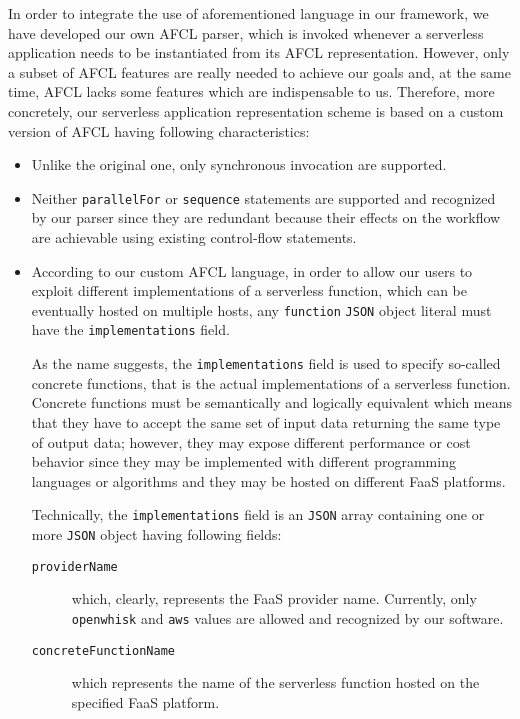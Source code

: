 \documentclass[12pt,a4paper]{report}
\begin{document}
In order to integrate the use of aforementioned language in our framework, we have developed our own AFCL parser, which is invoked whenever a serverless application needs to be instantiated from its AFCL representation. However, only a subset of AFCL features are really needed to achieve our goals and, at the same time, AFCL lacks some features which are indispensable to us. Therefore, more concretely, our serverless application representation scheme is based on a custom version of AFCL having following characteristics:

\begin{itemize}
	\item Unlike the original one, only synchronous invocation are supported.
	
	\item Neither \texttt{parallelFor} or \texttt{sequence} statements are supported and recognized by our parser since they are redundant because their effects on the workflow are achievable using existing control-flow statements.
	
	\item According to our custom AFCL language, in order to allow our users to exploit different implementations of a serverless function, which can be eventually hosted on multiple hosts, any \texttt{function} \texttt{JSON} object literal must have the \texttt{implementations} field.
	
	As the name suggests, the \texttt{implementations} field is used to specify so-called concrete functions, that is the actual implementations of a serverless function. Concrete functions must be semantically and logically equivalent which means that they have to accept the same set of input data returning the same type of output data; however, they may expose different performance or cost behavior since they may be implemented with different programming languages or algorithms and they may be hosted on different FaaS platforms.
	
	Technically, the \texttt{implementations} field is an \texttt{JSON} array containing one or more \texttt{JSON} object having following fields:
	
	\begin{description}
		\item[\texttt{providerName}] which, clearly, represents the FaaS provider name. Currently, only \texttt{openwhisk} and \texttt{aws} values are allowed and recognized by our software.
		
		\item[\texttt{concreteFunctionName}] which represents the name of the serverless function hosted on the specified FaaS platform.
		

\end{description}
\end{itemize}
\end{document}
